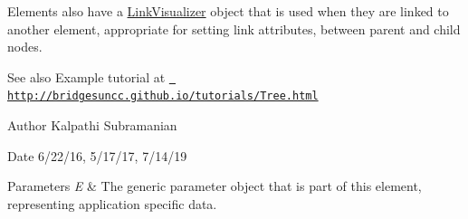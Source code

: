 Elements also have a \mbox{\hyperlink{classbridges_1_1base_1_1_link_visualizer}{Link\+Visualizer}} object that is used when they are linked to another element, appropriate for setting link attributes, between parent and child nodes.

\begin{DoxySeeAlso}{See also}
Example tutorial at \href{http://bridgesuncc.github.io/tutorials/Tree.html}{\texttt{ http\+://bridgesuncc.\+github.\+io/tutorials/\+Tree.\+html}}
\end{DoxySeeAlso}
\begin{DoxyAuthor}{Author}
Kalpathi Subramanian
\end{DoxyAuthor}
\begin{DoxyDate}{Date}
6/22/16, 5/17/17, 7/14/19
\end{DoxyDate}

\begin{DoxyParams}{Parameters}
{\em E} & The generic parameter object that is part of this element, representing application specific data. \\
\hline
\end{DoxyParams}
